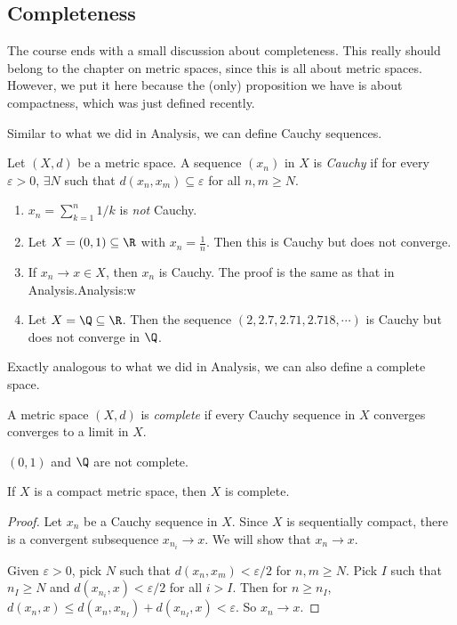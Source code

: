 \documentclass[a4paper]{article}
\begin{document}
\subsection{Completeness}
The course ends with a small discussion about completeness. This really should belong to the chapter on metric spaces, since this is all about metric spaces. However, we put it here because the (only) proposition we have is about compactness, which was just defined recently.

Similar to what we did in Analysis, we can define Cauchy sequences.
\begin{defi}
  Let $(X, d)$ be a metric space. A sequence $(x_n)$ in $X$ is \emph{Cauchy} if for every $\varepsilon > 0$, $\exists N$ such that $d(x_n, x_m) \subseteq \varepsilon$ for all $n, m \geq N$.
\end{defi}

\begin{eg}\leavevmode
  \begin{enumerate}
    \item $x_n = \sum_{k = 1}^n 1/k$ is \emph{not} Cauchy.
    \item Let $X = (0, 1) \subseteq \R$ with $x_n = \frac{1}{n}$. Then this is Cauchy but does not converge.
    \item If $x_n \to x\in X$, then $x_n$ is Cauchy. The proof is the same as that in Analysis.Analysis:w

    \item Let $X = \Q \subseteq \R$. Then the sequence $(2, 2.7, 2.71, 2.718, \cdots)$ is Cauchy but does not converge in $\Q$.
  \end{enumerate}
\end{eg}

Exactly analogous to what we did in Analysis, we can also define a complete space.
\begin{defi}
  A metric space $(X, d)$ is \emph{complete} if every Cauchy sequence in $X$ converges converges to a limit in $X$.
\end{defi}

\begin{eg}
  $(0, 1)$ and $\Q$ are not complete.
\end{eg}

\begin{prop}
  If $X$ is a compact metric space, then $X$ is complete.
\end{prop}

\begin{proof}
  Let $x_n$ be a Cauchy sequence in $X$. Since $X$ is sequentially compact, there is a convergent subsequence $x_{n_i}\to x$. We will show that $x_n \to x$.
  
  Given $\varepsilon > 0$, pick $N$ such that $d(x_n, x_m) < \varepsilon/2$ for $n,m \geq N$. Pick $I$ such that $n_I \geq N$ and $d(x_{n_i}, x) < \varepsilon/2$ for all $i> I$. Then for $n \geq n_I$, $d(x_n, x) \leq d(x_n, x_{n_I}) + d(x_{n_I}, x) < \varepsilon$. So $x_n \to x$.
\end{proof}
\end{document}
